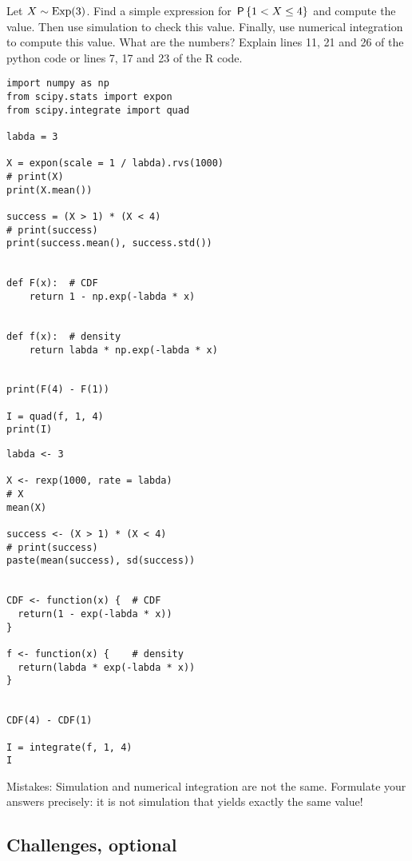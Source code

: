 \documentclass[assignments]{subfiles}
\begin{document}
\begin{exercise}
Let $X\sim\Exp{3}$.
Find a simple expression for $\P{1 < X \leq 4}$ and compute the value.
Then use simulation to check this value.
Finally, use numerical integration to compute this value. What are the numbers? Explain lines 11, 21 and 26 of the python code or lines 7, 17 and 23 of the R code.

\begin{verbatim}
import numpy as np
from scipy.stats import expon
from scipy.integrate import quad

labda = 3

X = expon(scale = 1 / labda).rvs(1000)
# print(X)
print(X.mean())

success = (X > 1) * (X < 4)
# print(success)
print(success.mean(), success.std())


def F(x):  # CDF
    return 1 - np.exp(-labda * x)


def f(x):  # density
    return labda * np.exp(-labda * x)


print(F(4) - F(1))

I = quad(f, 1, 4)
print(I)
\end{verbatim}



\begin{verbatim}
labda <- 3

X <- rexp(1000, rate = labda)
# X
mean(X)

success <- (X > 1) * (X < 4)
# print(success)
paste(mean(success), sd(success))


CDF <- function(x) {  # CDF
  return(1 - exp(-labda * x))
}

f <- function(x) {    # density
  return(labda * exp(-labda * x))
}


CDF(4) - CDF(1)

I = integrate(f, 1, 4)
I
\end{verbatim}
\begin{solution}
Mistakes: Simulation and numerical integration are not the same.
Formulate your answers precisely: it is not simulation that yields exactly the same value!
\end{solution}

\end{exercise}


\subsection{Challenges, optional}
\label{sec:above-exam-level}
\end{document}
